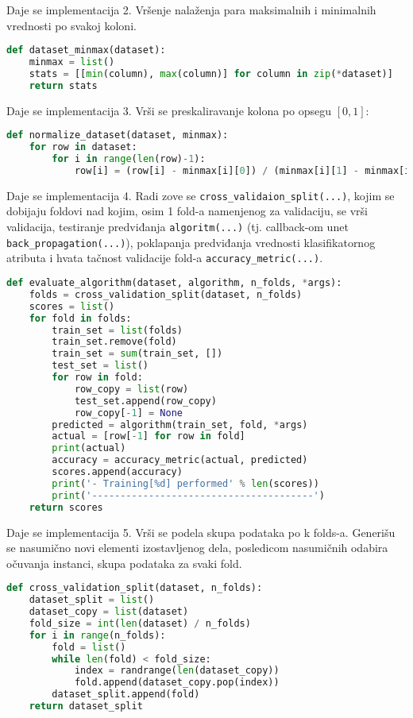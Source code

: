 \documentclass[fontsize=11bp, paper=a4]{scrarticle}
\begin{document}
Daje se implementacija 2. Vršenje nalaženja para maksimalnih i minimalnih vrednosti po svakoj koloni.
\begin{lstlisting}[language=Python, caption=\texttt{dataset\_minmax}]
def dataset_minmax(dataset):
    minmax = list()
    stats = [[min(column), max(column)] for column in zip(*dataset)]
    return stats
\end{lstlisting}

Daje se implementacija 3. Vrši se preskaliravanje kolona po opsegu $[0,1]$:
\begin{lstlisting}[language=Python, caption=\texttt{normalize\_dataset}]
def normalize_dataset(dataset, minmax):
    for row in dataset:
        for i in range(len(row)-1):
            row[i] = (row[i] - minmax[i][0]) / (minmax[i][1] - minmax[i][0])
\end{lstlisting}

Daje se implementacija 4. Radi zove se \verb|cross_validaion_split(...)|, kojim se dobijaju foldovi nad kojim, osim 1 fold-a namenjenog za validaciju, se vrši validacija, testiranje predviđanja \verb|algoritm(...)| (tj. callback-om unet \verb|back_propagation(...)|), poklapanja predviđanja vrednosti klasifikatornog atributa i hvata tačnost validacije fold-a \verb |accuracy_metric(...)|.

\begin{lstlisting}[language=Python, caption=\texttt{evaluate\_algorithm}]
def evaluate_algorithm(dataset, algorithm, n_folds, *args):
    folds = cross_validation_split(dataset, n_folds)
    scores = list()
    for fold in folds:
        train_set = list(folds)        
        train_set.remove(fold)         
        train_set = sum(train_set, [])
        test_set = list()
        for row in fold:               
            row_copy = list(row)
            test_set.append(row_copy)
            row_copy[-1] = None
        predicted = algorithm(train_set, fold, *args)
        actual = [row[-1] for row in fold]
        print(actual)
        accuracy = accuracy_metric(actual, predicted)
        scores.append(accuracy)
        print('- Training[%
        print('---------------------------------------')
    return scores
\end{lstlisting}

Daje se implementacija 5. Vrši se podela skupa podataka po k folds-a.\cite{cval} Generišu se nasumično novi elementi izostavljenog dela, posledicom nasumičnih odabira očuvanja instanci, skupa podataka za svaki fold.

\begin{lstlisting}[language=Python, caption=\texttt{cross\_validaion\_split}]
def cross_validation_split(dataset, n_folds):
    dataset_split = list()
    dataset_copy = list(dataset)
    fold_size = int(len(dataset) / n_folds)
    for i in range(n_folds):
        fold = list()
        while len(fold) < fold_size:
            index = randrange(len(dataset_copy))
            fold.append(dataset_copy.pop(index))
        dataset_split.append(fold)
    return dataset_split
\end{lstlisting}
\end{document}
